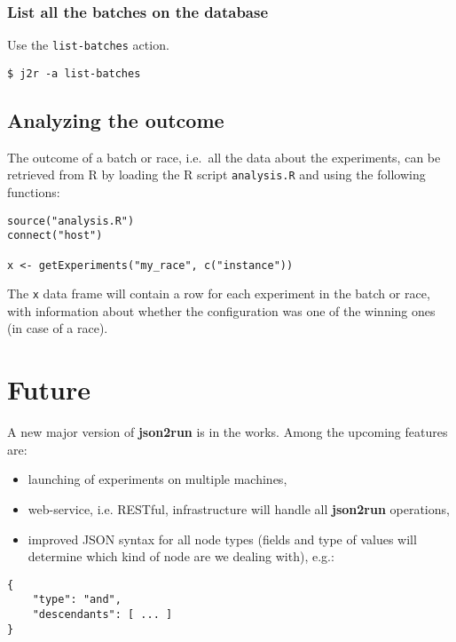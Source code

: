 \documentclass[11pt,notitlepage,twoside,a4paper]{article}
\begin{document}
\subsubsection{List all the batches on the database}

Use the \texttt{list-batches} action.

\begin{lstlisting}
$ j2r -a list-batches
\end{lstlisting}

\subsection{Analyzing the outcome}

The outcome of a batch or race, i.e.~all the data about the experiments,
can be retrieved from R by loading the R script \texttt{analysis.R} and
using the following functions:

\begin{lstlisting}
source("analysis.R")
connect("host") 

x <- getExperiments("my_race", c("instance"))   
\end{lstlisting}

\noindent
The \texttt{x} data frame will contain a row for each experiment in the
batch or race, with information about whether the configuration was one
of the winning ones (in case of a race).

\section{Future}

A new major version of \textbf{json2run} is in the works. Among the upcoming features are:

\begin{itemize}

    \item launching of experiments on multiple machines,
    \item web-service, i.e. RESTful, infrastructure will handle all \textbf{json2run} operations,
    \item improved JSON syntax for all node types (fields and type of values will determine which kind of node are we dealing with), e.g.:
\end{itemize}

\begin{lstlisting}
{
    "type": "and",
    "descendants": [ ... ]
}
\end{lstlisting}
\end{document}
